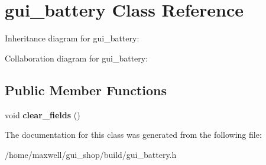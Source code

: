 \hypertarget{classgui__battery}{}\section{gui\+\_\+battery Class Reference}
\label{classgui__battery}


Inheritance diagram for gui\+\_\+battery\+:


Collaboration diagram for gui\+\_\+battery\+:
\subsection*{Public Member Functions}
\begin{DoxyCompactItemize}
\item 
void {\bfseries clear\+\_\+fields} ()\hypertarget{classgui__battery_ac149006835c75a13937f648371c344cd}{}\label{classgui__battery_ac149006835c75a13937f648371c344cd}

\end{DoxyCompactItemize}


The documentation for this class was generated from the following file\+:\begin{DoxyCompactItemize}
\item 
/home/maxwell/gui\+\_\+shop/build/gui\+\_\+battery.\+h\end{DoxyCompactItemize}
